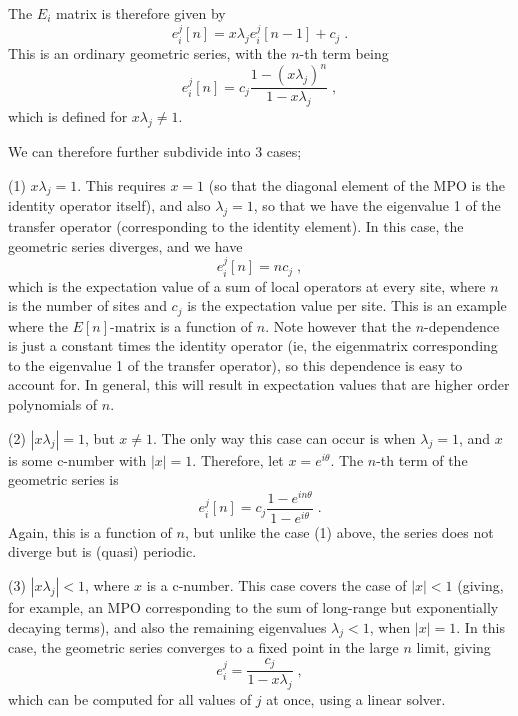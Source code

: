 \documentclass{article}[10pt]
\begin{document}
The $E_i$ matrix is therefore given by
\begin{equation}
e^j_i[n] = x \lambda_j e^j_i[n-1] + c_j \; .
\end{equation}
This is an ordinary geometric series, with the $n$-th term being
\begin{equation}
e^j_i[n] = c_j \frac{1 - (x\lambda_j)^n}{1-x\lambda_j} \; ,
\label{eq:SeriesSolution}
\end{equation}
which is defined for $x \lambda_j \neq 1$.

We can therefore further subdivide into 3 cases;

(1) $x \lambda_j = 1$. This requires $x = 1$ (so that the diagonal
element of the MPO is the identity operator itself), and also $\lambda_j=1$, so
that we have the eigenvalue 1 of the transfer operator (corresponding
to the identity element). In this case,
the geometric series diverges, and we have
\begin{equation}
e^j_i[n] = n c_j \; ,
\end{equation}
which is the expectation value of a sum of local operators at every site,
where $n$ is the number of sites and $c_j$ is the expectation value per site.
This is an example where the $E[n]$-matrix is a function of $n$. Note however
that the $n$-dependence is just a constant times the identity operator (ie, the
eigenmatrix corresponding to the eigenvalue 1 of the transfer operator), so
this dependence is easy to account for. In general, this will result in
expectation values that are higher order polynomials of $n$.

(2) $|x \lambda_j| = 1$, but $x \neq 1$. The only way this case can occur is when
$\lambda_j = 1$, and $x$ is some c-number with $|x|=1$. Therefore, let
$x = e^{i\theta}$.  The $n$-th term of the geometric series is
\begin{equation}
e^j_i[n] =  c_j \frac{1 - e^{in\theta}}{1-e^{i\theta}} \; .
\end{equation}
Again, this is a function of $n$, but unlike the case (1) above, the series
does not diverge but is (quasi) periodic. 

(3) $|x \lambda_j| < 1$, where $x$ is a c-number. This case covers
the case of $|x| < 1$ (giving, for example, an MPO corresponding to
the sum of long-range but exponentially decaying terms), and also the
remaining eigenvalues $\lambda_j < 1$, when $|x|=1$.
In this case, the geometric series converges to a fixed point in the large $n$ limit,
giving
\begin{equation}
e^j_i = \frac{c_j}{1 - x\lambda_j} \; ,
\label{eq:EigenExpansion}
\end{equation}
which can be computed for all values of $j$ at once, using a linear solver.
\end{document}
